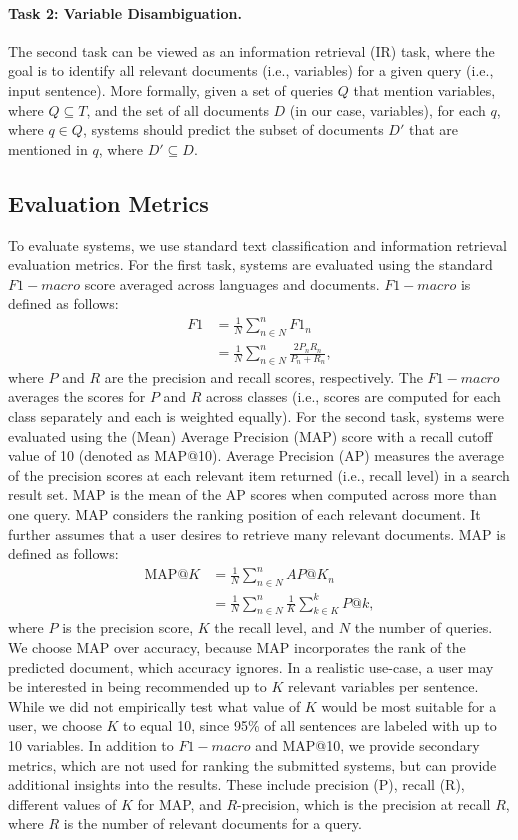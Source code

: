 \documentclass[11pt]{article}
\begin{document}
\paragraph{Task 2: Variable Disambiguation.} The second task can be viewed as an information retrieval (IR) task, where the goal is to identify all relevant documents (i.e., variables) for a given query (i.e., input sentence).
More formally, given a set of queries $Q$ that mention variables, where $Q \subseteq T$, and the set of all documents $D$ (in our case, variables), for each $q$, where $q \in Q$, systems should predict the subset of documents $D'$ that are mentioned in $q$, where $D' \subseteq D$.

\subsection{Evaluation Metrics}
To evaluate systems, we use standard text classification and information retrieval evaluation metrics.
For the first task, systems are evaluated using the standard $F1-macro$ score averaged across languages and documents.
$F1-macro$ is defined as follows:
\begin{align}
    F1 &= \frac{1}{N}\sum^n_{n \in N}F1_n \nonumber \\
    &= \frac{1}{N}\sum^n_{n \in N} \frac{2P_nR_n}{P_n+R_n},
\end{align}
\noindent where $P$ and $R$ are the precision and recall scores, respectively.
The $F1-macro$ averages the scores for $P$ and $R$ across classes (i.e., scores are computed for each class separately and each is weighted equally).
For the second task, systems were evaluated using the (Mean) Average Precision (MAP) score with a recall cutoff value of 10 (denoted as MAP@10).
Average Precision (AP) measures the average of the precision scores at each relevant item returned (i.e., recall level) in a search result set.
MAP is the mean of the AP scores when computed across more than one query. 
MAP considers the ranking position of each relevant document.
It further assumes that a user desires to retrieve many relevant documents.
MAP is defined as follows:
\begin{align}
    \text{MAP}@K &= \frac{1}{N}\sum^n_{n \in N}AP@K_n \nonumber \\
    &= \frac{1}{N}\sum^n_{n \in N}\frac{1}{K}\sum^k_{k \in K}P@k,
\end{align}
\noindent where $P$ is the precision score, $K$ the recall level, and $N$ the number of queries.
We choose MAP over accuracy, because MAP incorporates the rank of the predicted document, which accuracy ignores.
In a realistic use-case, a user may be interested in being recommended up to $K$ relevant variables per sentence.
While we did not empirically test what value of $K$ would be most suitable for a user, we choose $K$ to equal 10, since 95\% of all sentences are labeled with up to 10 variables.
In addition to $F1-macro$ and MAP@10, we provide secondary metrics, which are not used for ranking the submitted systems, but can provide additional insights into the results.
These include precision (P), recall (R), different values of $K$ for MAP, and $R$-precision, which is the precision at recall $R$, where $R$ is the number of relevant documents for a query.
\end{document}
